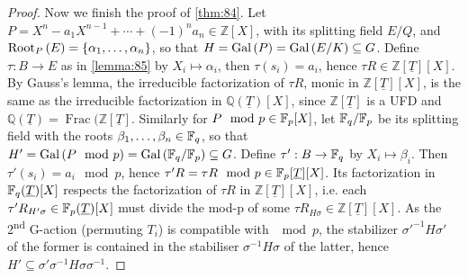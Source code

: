 \begin{proof}
Now we finish the proof of \autoref{thm:84}. Let $P = X^n - a_1X^{n-1} + \cdots + (-1)^na_n \in \mathbb{Z}[X]$, with its splitting field $E/Q$, and $\rootset[P]{E} = \{ \alpha_1, \ldots, \alpha_n \}$, so that $H = \Gal{P} = \Gal{E/K} \subseteq G$. Define $\tau : B \rightarrow E$ as in \autoref{lemma:85} by $X_i \mapsto \alpha_i$, then $\tau(s_i) = a_i$, hence $\tau{}R \in \mathbb{Z}[\underline{T}][X]$. By Gauss's lemma, the irreducible factorization of $\tau{}R$, monic in $\mathbb{Z}[\underline{T}][X]$, is the same as the irreducible factorization in $\mathbb{Q}(\underline{T})[X]$, since $\mathbb{Z}[\underline{T}]$ is a UFD and $\mathbb{Q}(\underline{T}) = \operatorname{Frac}(\mathbb{Z}[\underline{T}]$. Similarly for $P \mod p \in \finitefield{p}[X]$, let $\finitefield{q}/\finitefield{p}$ be its splitting field with the roots $\beta_1, \ldots, \beta_n \in \finitefield{q}$, so that $H' = \Gal{P \mod p} = \Gal{\finitefield{q}/\finitefield{p}} \subseteq G$. Define $\tau': B \rightarrow \finitefield{q}$ by $X_i \mapsto \beta_i$. Then $\tau'(s_i) = a_i \mod p$, hence $\tau'R = \tau{}R \mod p \in \finitefield{p}[\underline{T}][X]$. Its factorization in $\finitefield{q}(\underline{T})[X]$ respects the factorization of $\tau{}R$ in $\mathbb{Z}[\underline{T}][X]$, i.e. each $\tau'R_{H'\sigma} \in \finitefield{p}(\underline{T})[X]$ must divide the mod-p of some $\tau{}R_{H\sigma} \in \mathbb{Z}[\underline{T}][X]$. As the 2\textsuperscript{nd} G-action (permuting $T_i$) is compatible with $\mod p$, the stabilizer $\sigma'^{-1}H\sigma'$ of the former is contained in the stabiliser $\sigma^{-1}H\sigma$ of the latter, hence $H' \subseteq \sigma'\sigma^{-1}H\sigma\sigma^{-1}$.

\end{proof}

